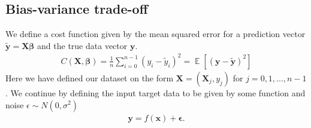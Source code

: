 \documentclass[11pt]{article}
\DeclareMathOperator*{\E}{\mathbb{E}}
\begin{document}
\subsection*{Bias-variance trade-off}
We define a cost function given by the mean squared error for a prediction vector $\tilde{\boldsymbol{y}}= \boldsymbol{X} \boldsymbol{\beta}$ and the true data vector $\boldsymbol{y}$.
\begin{align*}
    C(\boldsymbol{X}, \boldsymbol{\beta}) = \frac{1 }{n }\sum_ {i=0}^{n-1}(y_i - \tilde{y}_i)^2 = \E[(\boldsymbol{y}- \boldsymbol{\tilde{y}})^2]
\end{align*}
Here we have defined our dataset on the form $\boldsymbol{X} = (\boldsymbol{X}_j, y_j)$ for $j= 0, 1, ..., n-1$.
We continue by defining the input target data to be given by some function and noise $\epsilon\sim N(0, \sigma^2)$
\begin{align*}
    \boldsymbol{y} = f(\boldsymbol{x}) + \boldsymbol{\epsilon}.
\end{align*}
\end{document}
